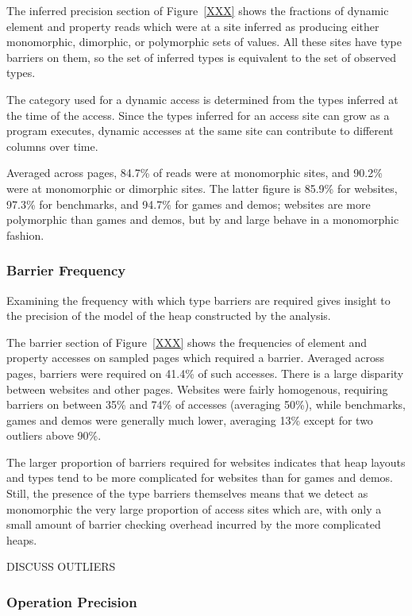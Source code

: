The inferred precision section of Figure~\ref{XXX} shows the fractions
of dynamic element and property reads which were at a site inferred
as producing
either monomorphic, dimorphic, or polymorphic sets of values.
All these sites have type barriers on them, so the set of inferred types
is equivalent to the set of observed types.

The category used for a dynamic access is determined from the types
inferred at the time of the access.
Since the types inferred for an access site can grow as a program executes,
dynamic accesses at the same site can contribute to different
columns over time.

Averaged across pages, 84.7\% of reads were at monomorphic
sites, and 90.2\% were at monomorphic or dimorphic sites.
The latter figure is 85.9\% for websites, 97.3\% for benchmarks,
and 94.7\% for games and demos; websites are more polymorphic than games
and demos, but by and large behave in a monomorphic fashion.

\subsubsection{Barrier Frequency}

Examining the frequency with which type barriers are required
gives insight to the precision of the model of the heap constructed by
the analysis.

The barrier section of Figure~\ref{XXX} shows the frequencies of
element and property accesses on sampled pages which required a barrier.
Averaged across pages, barriers were required on 41.4\% of such accesses.
There is a large disparity between websites and other pages.
Websites were fairly homogenous, requiring barriers on between 35\%
and 74\% of accesses (averaging 50\%), while benchmarks,
games and demos were generally
much lower, averaging 13\% except for two outliers above 90\%.

The larger proportion of barriers required for websites indicates that
heap layouts and types tend to be more complicated for websites than for
games and demos.
Still, the presence of the type barriers themselves means that we
detect as monomorphic the very large proportion of access sites which are,
with only a small amount of barrier checking overhead incurred by the
more complicated heaps.

DISCUSS OUTLIERS

\subsubsection{Operation Precision}

